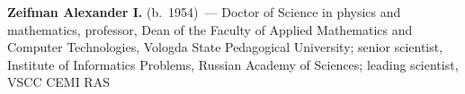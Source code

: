 \begin{multicols}{2}
\vspace*{6pt}


\noindent
\textbf{Zeifman Alexander I.} (b.\ 1954)~--- Doctor of Science in physics and
mathematics, professor, Dean of the Faculty of Applied Mathematics
and Computer Technologies, Vologda State Pedagogical University;
senior scientist, Institute of Informatics Problems, Russian Academy of Sciences; leading
scientist, VSCC CEMI RAS


\thispagestyle{myheadings}

\end{multicols}

\newpage